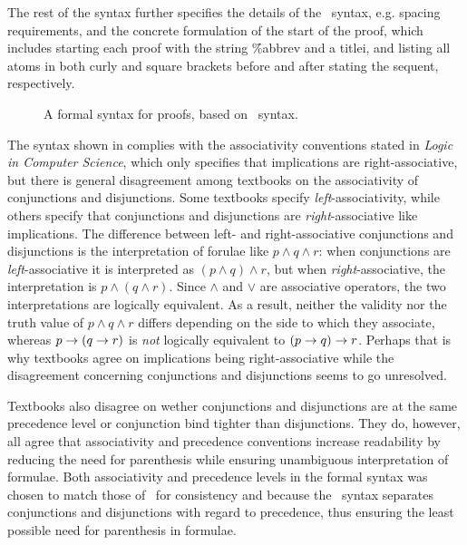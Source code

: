 \documentclass[BA.tex]{subfiles}
\begin{document}
 The rest of the syntax further 
 specifies the details of the \bp\ syntax, e.g. spacing requirements, and
 the concrete formulation of the start of the proof, which includes starting
 each proof with the string \f{\%abbrev} and a titlei, and listing all atoms
 in both curly and square
 brackets before and after stating the sequent, respectively.


\begin{figure}[H]

\caption{A formal syntax for proofs, based on \bp\ syntax.}
\label{fproof}
\end{figure}


The syntax shown in  complies with the associativity 
conventions stated in \emph{Logic in Computer Science}\cite[p.~5]{hr}, which
only specifies that implications are right-associative, but there is
general disagreement among textbooks on the associativity of conjunctions
and disjunctions. Some textbooks specify 
\emph{left}-associativity\cite[p.~46]{disc}, while others specify that 
conjunctions and disjunctions are \emph{right}-associative like 
implications\cite[p.~11]{math}\cite[p.~5]{calc}. The difference between
left- and right-associative conjunctions and disjunctions is the
interpretation of forulae like \(p \land q \land r\): when conjunctions are
\emph{left}-associative it is interpreted as \((p \land q) \land r\), but
when \emph{right}-associative, the interpretation is \(p \land (q \land r)\).
Since \(\land\) and \(\lor\) are associative operators, the two 
interpretations are logically equivalent. 
As a result, neither the validity nor the truth value of
\(p \land q \land r\) differs depending on the side to which they
associate, whereas \(p \rightarrow (q \rightarrow r)\) is \emph{not} logically equivalent
to \((p \rightarrow q) \rightarrow r\). Perhaps that is why textbooks agree on implications
being right-associative while the disagreement concerning conjunctions and
disjunctions seems to go unresolved.

Textbooks also disagree on wether conjunctions and disjunctions
are at the same precedence level\cite{hr} or conjunction bind tighter than
disjunctions\cite{math}\cite{calc}\cite{disc}. They do, however, all
agree that associativity and precedence conventions increase readability
by reducing the need for parenthesis while ensuring unambiguous
interpretation of 
formulae\cite[p.~5]{hr}\cite[p.~46]{disc}\cite[p.~10]{math}\cite[p.~5]{calc}.
Both associativity and precedence levels in the formal syntax was chosen 
to match those of \bp\ for consistency and because the \bp\ syntax separates
conjunctions and disjunctions with regard to precedence, thus ensuring the
least possible need for parenthesis in formulae.
\end{document}
